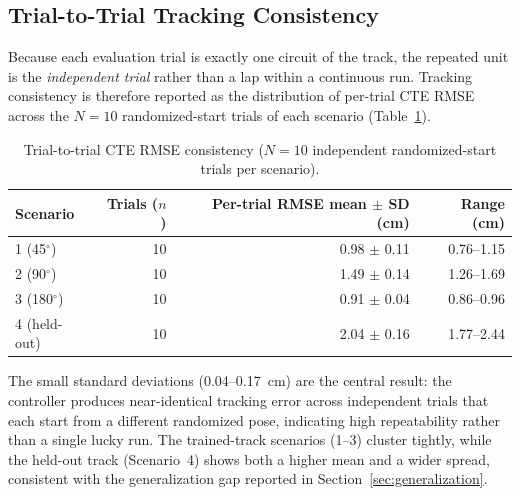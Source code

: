 
\subsection{Trial-to-Trial Tracking Consistency}
\label{sec:per_lap_consistency}
Because each evaluation trial is exactly one circuit of the track, the repeated unit is the
\emph{independent trial} rather than a lap within a continuous run. Tracking consistency is therefore
reported as the distribution of per-trial CTE RMSE across the $N=10$ randomized-start trials of each
scenario (Table~\ref{tab:per_lap_consistency}).

\begin{table}[H]
\centering
\caption{Trial-to-trial CTE RMSE consistency ($N=10$ independent randomized-start trials per scenario).}
\label{tab:per_lap_consistency}
\footnotesize
\begin{tabular}{@{}l r r r@{}}
\toprule
\textbf{Scenario} & \textbf{Trials ($n$)} & \textbf{Per-trial RMSE mean $\pm$ SD (cm)} & \textbf{Range (cm)} \\
\midrule
1 (45$^\circ$)   & 10 & 0.98 $\pm$ 0.11 & 0.76--1.15 \\
2 (90$^\circ$)   & 10 & 1.49 $\pm$ 0.14 & 1.26--1.69 \\
3 (180$^\circ$)  & 10 & 0.91 $\pm$ 0.04 & 0.86--0.96 \\
4 (held-out)     & 10 & 2.04 $\pm$ 0.16 & 1.77--2.44 \\
\bottomrule
\end{tabular}
\end{table}

The small standard deviations (0.04--0.17~cm) are the central result: the controller produces
near-identical tracking error across independent trials that each start from a different randomized
pose, indicating high repeatability rather than a single lucky run. The trained-track scenarios
(1--3) cluster tightly, while the held-out track (Scenario~4) shows both a higher mean and a wider
spread, consistent with the generalization gap reported in Section~\ref{sec:generalization}.
